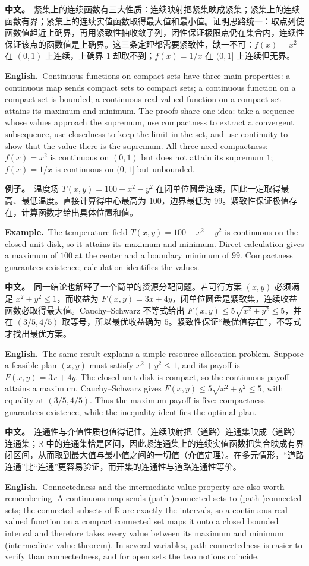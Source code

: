 \documentclass[UTF8,11pt,a4paper]{ctexart}
\newcommand{\BOTH}[2]{\par\noindent\textbf{中文。}\ #1\par\noindent\textbf{English.}\ #2\par}
\newcommand{\EX}[2]{\par\noindent\textbf{例子。}\ #1\par\noindent\textbf{Example.}\ #2\par}
\begin{document}
\BOTH{紧集上的连续函数有三大性质：连续映射把紧集映成紧集；紧集上的连续函数有界；紧集上的连续实值函数取得最大值和最小值。证明思路统一：取点列使函数值趋近上确界，再用紧致性抽收敛子列，闭性保证极限点仍在集合内，连续性保证该点的函数值是上确界。这三条定理都需要紧致性，缺一不可：$f(x)=x^2$ 在 $(0,1)$ 上连续，上确界 $1$ 却取不到；$f(x)=1/x$ 在 $(0,1]$ 上连续但无界。}{Continuous functions on compact sets have three main properties: a continuous map sends compact sets to compact sets; a continuous function on a compact set is bounded; a continuous real-valued function on a compact set attains its maximum and minimum. The proofs share one idea: take a sequence whose values approach the supremum, use compactness to extract a convergent subsequence, use closedness to keep the limit in the set, and use continuity to show that the value there is the supremum. All three need compactness: $f(x)=x^2$ is continuous on $(0,1)$ but does not attain its supremum $1$; $f(x)=1/x$ is continuous on $(0,1]$ but unbounded.}
\EX{温度场 $T(x,y)=100-x^2-y^2$ 在闭单位圆盘连续，因此一定取得最高、最低温度。直接计算得中心最高为 $100$，边界最低为 $99$。紧致性保证极值存在，计算函数才给出具体位置和值。}{The temperature field $T(x,y)=100-x^2-y^2$ is continuous on the closed unit disk, so it attains its maximum and minimum. Direct calculation gives a maximum of $100$ at the center and a boundary minimum of $99$. Compactness guarantees existence; calculation identifies the values.}
\BOTH{同一结论也解释了一个简单的资源分配问题。若可行方案 $(x,y)$ 必须满足 $x^2+y^2\le1$，而收益为 $F(x,y)=3x+4y$，闭单位圆盘是紧致集，连续收益函数必取得最大值。Cauchy--Schwarz 不等式给出 $F(x,y)\le5\sqrt{x^2+y^2}\le5$，并在 $(3/5,4/5)$ 取等号，所以最优收益确为 $5$。紧致性保证“最优值存在”，不等式才找出最优方案。}{The same result explains a simple resource-allocation problem. Suppose a feasible plan $(x,y)$ must satisfy $x^2+y^2\le1$, and its payoff is $F(x,y)=3x+4y$. The closed unit disk is compact, so the continuous payoff attains a maximum. Cauchy--Schwarz gives $F(x,y)\le5\sqrt{x^2+y^2}\le5$, with equality at $(3/5,4/5)$. Thus the maximum payoff is five: compactness guarantees existence, while the inequality identifies the optimal plan.}
\BOTH{连通性与介值性质也值得记住。连续映射把（道路）连通集映成（道路）连通集；$\mathbb R$ 中的连通集恰是区间，因此紧连通集上的连续实值函数把集合映成有界闭区间，从而取到最大值与最小值之间的一切值（介值定理）。在多元情形，“道路连通”比“连通”更容易验证，而开集的连通性与道路连通性等价。}{Connectedness and the intermediate value property are also worth remembering. A continuous map sends (path-)connected sets to (path-)connected sets; the connected subsets of $\mathbb R$ are exactly the intervals, so a continuous real-valued function on a compact connected set maps it onto a closed bounded interval and therefore takes every value between its maximum and minimum (intermediate value theorem). In several variables, path-connectedness is easier to verify than connectedness, and for open sets the two notions coincide.}
\end{document}

